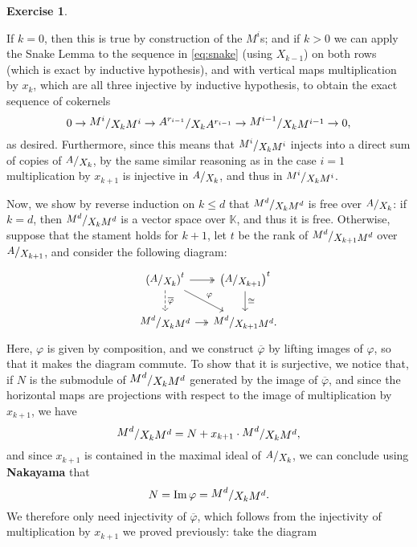 \documentclass[a4paper]{article}
\newcommand{\K}{\mathbb{K}}
\newcommand{\sfrac}[2]{
    \raisebox{+0.3ex}{$#1$}
    /
    \raisebox{-0.3ex}{$#2$}
}
\newcommand{\ssfrac}[2]{
    \raisebox{+0.3ex}{\scalebox{0.9}{$#1$}}
    /
    \raisebox{-0.3ex}{\scalebox{0.9}{$#2$}}
}
\renewcommand{\Im}{\operatorname{Im}}
\theoremstyle{definition}
\theoremstyle{definition}
\theoremstyle{remark}
\theoremstyle{definition}
\newtheorem{exercise}{Exercise}[section]
\begin{document}
\begin{exercise}
\begin{itemize}
		If $k=0$, then this is true by construction of the $M^i$s; and if $k>0$ we can apply the Snake Lemma to the sequence in \eqref{eq:snake} (using $X_{k-1}$) on both
		rows (which is exact by inductive hypothesis), and with vertical
		maps multiplication by $x_k$, which are all three injective by inductive hypothesis, to obtain the exact sequence of cokernels
		$$ 0\rightarrow \sfrac{M^i}{X_k M^i}\rightarrow \sfrac{A^{r_{i-1}}}{X_k A^{r_{i-1}}}\rightarrow\sfrac{M^{i-1}}{X_k M^{i-1}}\rightarrow 0 ,$$
		as desired. Furthermore, since this means that $\ssfrac{M^i}{X_k M^i}$ injects into a direct sum of copies of $\ssfrac{A}{X_k}$, by the same similar reasoning as in
		the case $i=1$ multiplication by $x_{k+1}$ is injective in $\ssfrac{A}{X_k}$, and thus in $\ssfrac{M^i}{X_k M^i}$.

		Now, we show by reverse induction on $k\leq d$ that $\ssfrac{M^d}{X_k M^d}$ is free over $\ssfrac{A}{X_k}$: if $k=d$, then $\ssfrac{M^d}{X_k M^d}$ is a vector space
		over $\K$, and thus it is free. Otherwise, suppose that the stament holds for $k+1$, let $t$ be the rank of $\ssfrac{M^d}{X_{k+1} M^d}$ over $\ssfrac{A}{X_{k+1}}$,
		and consider the following diagram:
		\begin{equation*}
			\begin{tikzcd}[column sep=small]
				\left(\ssfrac{A}{X_{k}}\right)^t\ar[d, dashed, "\overline{\varphi}"]\rar[two heads]\ar[rd,"\varphi"]&\left(\ssfrac{A}{X_{k+1}}\right)^t\ar[d,"\cong"]\\
				\ssfrac{M^d}{X_{k} M^d}\rar[two heads]&\ssfrac{M^d}{X_{k+1} M^d}.
			\end{tikzcd}
		\end{equation*}
		Here, $\varphi$ is given by composition, and we construct $\overline{\varphi}$ by lifting images of $\varphi$, so that it makes the diagram commute. To show that it is surjective, we notice that, if
		$N$ is the submodule of $\sfrac{M^d}{X_k M^d}$ generated by the image of $\overline{\varphi}$, and since the horizontal maps are projections with respect to the
		image of multiplication by $x_{k+1}$, we have
		$$ \sfrac{M^d}{X_k M^d}=N+x_{k+1}\cdot\sfrac{M^d}{X_k M^d} ,$$
		and since $x_{k+1}$ is contained in the maximal ideal of $\ssfrac{A}{X_k}$, we can conclude using \textbf{Nakayama} that
		$$ N=\Im{\varphi}=\sfrac{M^d}{X_k M^d} .$$
		We therefore only need injectivity of $\overline{\varphi}$, which follows from the injectivity of multiplication by $x_{k+1}$ we proved previously: take the diagram


\end{itemize}
\end{exercise}
\end{document}

